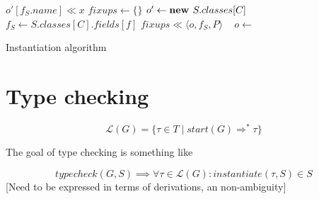 \documentclass[preprint,10pt]{sigplanconf}
\begin{document}
\begin{algorithm}
\begin{center}
\begin{algorithmic}[1]
    \State $o'[f_S.name] \ll x$ 
  \EndProcedure
  \State $fixups \gets \{\}$
        $o'\gets \text{\textbf{new }}S.classes[C]$
          \State $f_S \gets S.classes[C].fields[f]$
          \State {}
       \EndFor
       \State {}
        $fixups \ll \langle o, f_S, P\rangle$
       \State \Return{$\bot$}
    \Else
       \ \Return{}
    \EndCase
  \EndFunction
  \State $o \gets$ 
    \State {}
  \EndFor
  \State {}
\EndFunction
\end{algorithmic}
\end{center}
\caption{Instantiation algorithm\label{ALG:instantiate}}
\end{algorithm}

\section{Type checking}

\[
\mathcal{L}(G) = \{ \tau\in T \mid start(G) \Rightarrow^* \tau \}
\]

The goal of type checking is something like

\[
typecheck(G, S) \implies \forall \tau \in \mathcal{L}(G): 
instantiate(\tau, S) \in S
\]
[Need to be expressed in terms of derivations, an non-ambiguity]


\def\myjoin{\ensuremath{\mid}}
\def\mymeet{\ensuremath{\cdot}}
\end{document}
